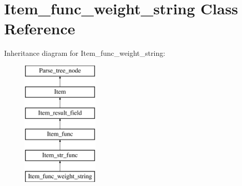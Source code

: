 \hypertarget{classItem__func__weight__string}{}\section{Item\+\_\+func\+\_\+weight\+\_\+string Class Reference}
\label{classItem__func__weight__string}
Inheritance diagram for Item\+\_\+func\+\_\+weight\+\_\+string\+:\begin{figure}[H]
\begin{center}
\leavevmode
\includegraphics[height=6.000000cm]{classItem__func__weight__string}
\end{center}
\end{figure}
